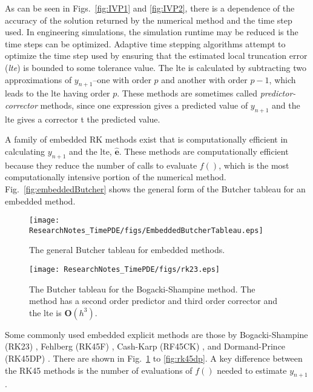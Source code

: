 As can be seen in Figs.~\ref{fig:IVP1} and \ref{fig:IVP2}, there is a dependence of the accuracy of the solution returned by the numerical method and the time step used. In engineering simulations, the simulation runtime may be reduced is the time steps can be optimized. Adaptive time stepping algorithms attempt to optimize the time step used by ensuring that the estimated local truncation error (\emph{lte}) is bounded to some tolerance value. The lte is calculated by subtracting two approximations of $y_{n+1}$--one with order $p$ and another with order $p-1$, which leads to the lte having order $p$. These methods are sometimes called \emph{predictor-corrector} methods, since one expression gives a predicted value of $y_{n+1}$ and the lte gives a corrector t the predicted value.

A family of embedded RK methods exist that is computationally efficient in calculating $y_{n+1}$ and the lte, $\widehat{\bm{e}}$. These methods are computationally efficient because they reduce the number of calls to evaluate $f()$, which is the most computationally intensive portion of the numerical method. Fig.~\ref{fig:embeddedButcher} shows the general form of the Butcher tableau for an embedded method.

\begin{figure}[H]
\centering
\begin{minipage}{0.45\linewidth}
\texttt{[image: ResearchNotes\_TimePDE/figs/EmbeddedButcherTableau.eps]}
\caption{The general Butcher tableau for embedded methods.}
\label{fig:embeddedButcher}
\end{minipage}
\quad\quad
\begin{minipage}{0.45\linewidth}
\centering
\texttt{[image: ResearchNotes\_TimePDE/figs/rk23.eps]}
\caption{The Butcher tableau for the Bogacki-Shampine method. The method has a second order predictor and third order corrector and the lte is $\bm{O}(h^{3})$.}
\label{fig:rk23}
\end{minipage}
\end{figure}

Some commonly used embedded explicit methods are those by Bogacki-Shampine (RK23) \cite{Bogacki1989}, Fehlberg (RK45F) \cite{Fehlberg1970}, Cash-Karp (RF45CK) \cite{Cash1990}, and Dormand-Prince (RK45DP) \cite{Dormand1980}. There are shown in Fig.~\ref{fig:rk23} to \ref{fig:rk45dp}. A key difference between the RK45 methods is the number of evaluations of $f()$ needed to estimate $y_{n+1}$.

